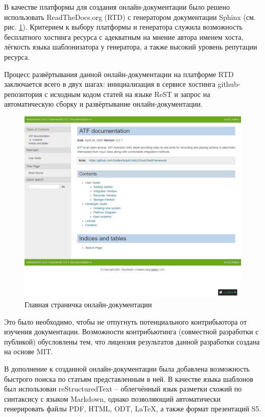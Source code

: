 В качестве платформы для создания онлайн-документации было решено использовать ReadTheDocs.org (RTD) с генератором документации Sphinx (см. рис. \ref{online_docs}). Критерием к выбору платформы и генератора служила возможность бесплатного хостинга ресурса с адекватным на мнение автора именем хоста, лёгкость языка шаблонизатора у генератора, а также высокий уровень репутации ресурса.

Процесс развёртывания данной онлайн-документации на платформе RTD заключается всего в двух шагах: инициализация в сервисе хостинга github-репозитория с исходным кодом статей на языке ReST и запрос на автоматическую сборку и развёртывание онлайн-документации.

\begin{figure}[H]
	\centering
	\includegraphics[width=\linewidth]{online_docs.png}
	\caption{Главная страничка онлайн-документации}
	\label{online_docs}
\end{figure}

Это было необходимо, чтобы не отпугнуть потенциального контрибьютора от изучения документации. Возможности контрибьютинга (совместной разработки с публикой) обусловлены тем, что лицензия результатов данной разработки создана на основе MIT.

В дополнение к созданной онлайн-документации была добавлена возможность быстрого поиска по статьям представленным в ней. В качестве языка шаблонов был использован reStructuredText -- облегчённый язык разметки схожий по синтаксису с языком Markdown, однако позволяющий автоматически генерировать файлы PDF, HTML, ODT, LaTeX, а также формат презентаций S5.